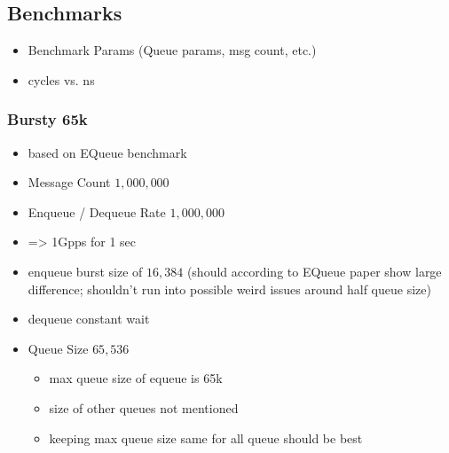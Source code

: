 \subsection{Benchmarks}
\begin{itemize}
    \item Benchmark Params (Queue params, msg count, etc.)
    \item cycles vs. ns
\end{itemize}
\subsubsection{Bursty 65k}
\begin{itemize}
    \item based on EQueue benchmark
    \item Message Count $1,000,000$
    \item Enqueue / Dequeue Rate $1,000,000$
    \item => 1Gpps for 1 sec
    \item enqueue burst size of $16,384$
          (should according to EQueue paper show large difference;
           shouldn't run into possible weird issues around half queue size)
    \item dequeue constant wait
    \item Queue Size $65,536$
        \begin{itemize}
            \item max queue size of equeue is 65k
            \item size of other queues not mentioned
            \item keeping max queue size same for all queue should be best 
        \end{itemize}
\end{itemize}
